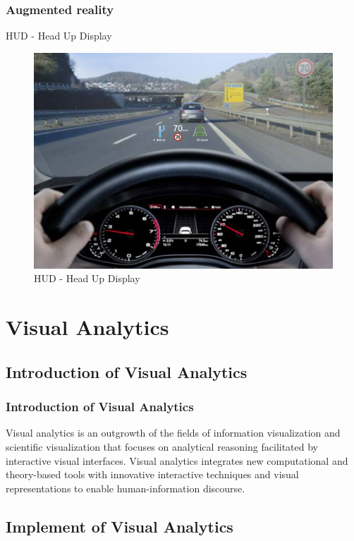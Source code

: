\documentclass{beamer}
\begin{document}
\begin{frame}
  \frametitle{Augmented reality}
  HUD - Head Up Display
  \begin{figure}
    \begin{center}
      \includegraphics[width=0.7\linewidth]{images//hud.jpeg}
      \caption{HUD - Head Up Display}
      \label{Fig:6}
    \end{center}
  \end{figure}
\end{frame}





\section{Visual Analytics}

\subsection{Introduction of Visual Analytics}

\begin{frame}
  \frametitle{Introduction of Visual Analytics}
  \qquad Visual analytics is an outgrowth of the fields of information visualization and scientific visualization that focuses on analytical reasoning facilitated by interactive visual interfaces. Visual analytics integrates new computational and theory-based tools with innovative interactive techniques and visual representations to enable human-information discourse.

\end{frame}

\subsection{Implement of Visual Analytics}
\end{document}
